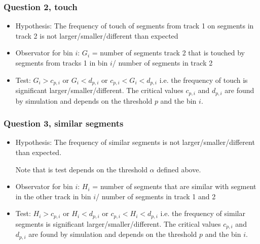\documentclass{article}
\begin{document}
\subsubsection {Question 2, touch}

\begin{itemize}
\item Hypothesis: The frequency of touch of segments from track 1 on segments in track 2 is not larger/smaller/different than expected 
	\item Observator for bin $i$: 
$  G_i $ =  number of  segments track 2 that is touched by segments from  tracks 1 in bin $i$/
               number of segments in track 2
\item Test: $G_i > c_{p,i}$ or  $G_i < d_{p,i}$ or  $  c_{p,i}<G_i < d_{p,i}$  i.e. the frequency of touch 
is significant larger/smaller/different.  The critical values   $  c_{p,i}$ and $ d_{p,i}$ are
 found by simulation and depends on the threshold $p$ and the bin  $i.$  
\end{itemize}

\subsubsection {Question 3, similar segments}

\begin{itemize}
\item Hypothesis: The frequency of similar segments is not larger/smaller/different than expected. 

Note that is test depends on the threshold $\alpha$ defined above.
	\item Observator for bin $i$: 
$  H_i $ =  number of  segments that are similar with segment in the other track in bin $i$/
            number of segments in track 1 and 2
\item Test: $H_i > c_{p,i}$ or  $H_i < d_{p,i}$ or  $  c_{p,i}<H_i < d_{p,i}$  i.e. the frequency of similar segments 
is significant larger/smaller/different.  The critical values   $  c_{p,i}$ and $ d_{p,i}$ are
 found by simulation and depends on the threshold $p$ and the bin  $i.$  
\end{itemize}
\end{document}
